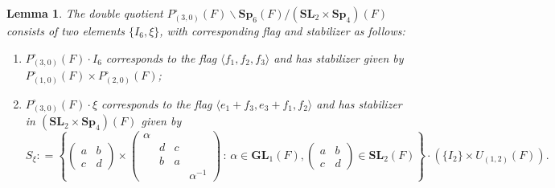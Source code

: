 \documentclass[11pt, reqno]{amsart}
\theoremstyle{plain}
\newtheorem{lemma}[theorem]{Lemma}
\theoremstyle{definition}
\theoremstyle{remark}
\theoremstyle{plain}
\def\SL{{\mathbf{SL}}}
\def\Sp{{\mathbf{Sp}}}
\def\GL{\mathbf{GL}}
\begin{document}
 \begin{lemma}\label{lemmaondoublecosetsimple} The double quotient 
     $P_{(3,0)}^\circ(F) \backslash \Sp_6(F) / (\SL_2\times \Sp_4)(F)$ consists of two elements $\{I_6,\xi\}$, with corresponding flag and stabilizer as follows: \begin{enumerate}
         \item  $P_{(3,0)}^\circ(F) \cdot I_6$ corresponds to the flag $\langle f_1,f_2,f_3 \rangle$ and has stabilizer given by $P_{(1,0)}^\circ(F) \times P_{(2,0)}^\circ(F)$;
         \item $P_{(3,0)}^\circ(F) \cdot \xi$ corresponds to the flag $\langle e_1 + f_3, e_3 + f_1, f_2 \rangle$ and has stabilizer in  $(\SL_2\times \Sp_4)(F)$ given by \[S_\xi : = \left \{ \left(\begin{smallmatrix}a & b \\ c & d\end{smallmatrix}\right) \times \left(\begin{smallmatrix}
      \alpha & &&\\&d&c&\\&b&a & \\&&&\alpha^{-1}
\end{smallmatrix}\right)\,:\, \alpha \in \GL_1(F), \left(\begin{smallmatrix}a & b \\ c & d\end{smallmatrix}\right) \in \SL_2(F) \right \} \cdot \left(\{ I_2\} \times U_{(1,2)}(F)\right). \]
     \end{enumerate}
 \end{lemma}
\end{document}
